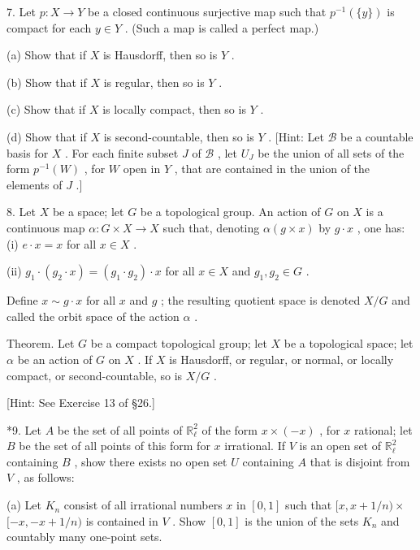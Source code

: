 7. Let \(p : X \rightarrow  Y\) be a closed continuous surjective map such that \({p}^{-1}\left( {\{ y\} }\right)\) is compact for each \(y \in  Y\) . (Such a map is called a perfect map.)

(a) Show that if \(X\) is Hausdorff, then so is \(Y\) .

(b) Show that if \(X\) is regular, then so is \(Y\) .

(c) Show that if \(X\) is locally compact, then so is \(Y\) .

(d) Show that if \(X\) is second-countable, then so is \(Y\) . [Hint: Let \(\mathcal{B}\) be a countable basis for \(X\) . For each finite subset \(J\) of \(\mathcal{B}\) , let \({U}_{J}\) be the union of all sets of the form \({p}^{-1}\left( W\right)\) , for \(W\) open in \(Y\) , that are contained in the union of the elements of \(J\) .]

8. Let \(X\) be a space; let \(G\) be a topological group. An action of \(G\) on \(X\) is a continuous map \(\alpha  : G \times  X \rightarrow  X\) such that, denoting \(\alpha \left( {g \times  x}\right)\) by \(g \cdot  x\) , one has: (i) \(e \cdot  x = x\) for all \(x \in  X\) .

(ii) \({g}_{1} \cdot  \left( {{g}_{2} \cdot  x}\right)  = \left( {{g}_{1} \cdot  {g}_{2}}\right)  \cdot  x\) for all \(x \in  X\) and \({g}_{1},{g}_{2} \in  G\) .

Define \(x \sim  g \cdot  x\) for all \(x\) and \(g\) ; the resulting quotient space is denoted \(X/G\) and called the orbit space of the action \(\alpha\) .

Theorem. Let \(G\) be a compact topological group; let \(X\) be a topological space; let \(\alpha\) be an action of \(G\) on \(X\) . If \(X\) is Hausdorff, or regular, or normal, or locally compact, or second-countable, so is \(X/G\) .

[Hint: See Exercise 13 of §26.]

*9. Let \(A\) be the set of all points of \({\mathbb{R}}_{\ell }^{2}\) of the form \(x \times  \left( {-x}\right)\) , for \(x\) rational; let \(B\) be the set of all points of this form for \(x\) irrational. If \(V\) is an open set of \({\mathbb{R}}_{\ell }^{2}\) containing \(B\) , show there exists no open set \(U\) containing \(A\) that is disjoint from \(V\) , as follows:

(a) Let \({K}_{n}\) consist of all irrational numbers \(x\) in \(\left\lbrack  {0,1}\right\rbrack\) such that \(\lbrack x,x + 1/n) \times\)  \(\lbrack  - x, - x + 1/n)\) is contained in \(V\) . Show \(\left\lbrack  {0,1}\right\rbrack\) is the union of the sets \({K}_{n}\) and countably many one-point sets.

